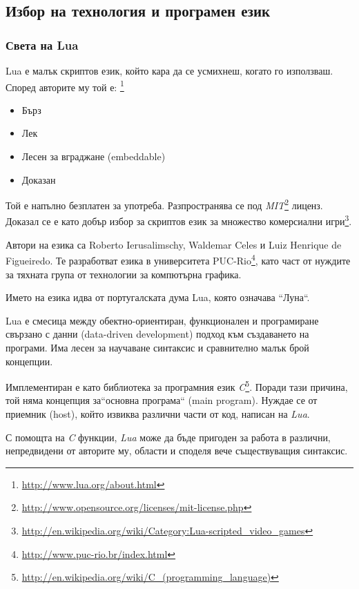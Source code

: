 	\subsection{Избор на технология и програмен език}
		\subsubsection{Света на Lua}
		
			Lua е малък скриптов език, който кара да се усмихнеш, когато го използваш. 
			Според авторите му той е: \footnote{\url{http://www.lua.org/about.html}} 
			
			\begin{itemize}
				\item Бърз
				\item Лек
				\item Лесен за вграджане (embeddable)
				\item Доказан
			\end{itemize}
			
			Той е напълно безплатен за употреба. Разпространява се под 
			\emph{MIT}\footnote{\url{http://www.opensource.org/licenses/mit-license.php}} лиценз. 
			Доказал се е като добър избор за скриптов език за множество комерсиални 
			игри\footnote{\url{http://en.wikipedia.org/wiki/Category:Lua-scripted_video_games}}.
			
			Автори на езика са Roberto Ierusalimschy, Waldemar Celes и Luiz Henrique de Figueiredo. Те разработват езика в
			университета PUC-Rio\footnote{\url{http://www.puc-rio.br/index.html}}, като част от нуждите за тяхната група
			от технологии за компютърна графика. 
			
			Името на езика идва от португалската дума Lua, която означава ``Луна``.
			
			Lua е смесица между обектно-ориентиран, функционален и програмиране свързано с данни (data-driven development)
			подход към създаването на програми. Има лесен за научаване синтаксис и сравнително малък брой концепции. 
			
			Имплементиран е като библиотека за програмния език \emph{C}\footnote{\url{http://en.wikipedia.org/wiki/C_(programming_language)}}. 
			Поради тази причина, той няма концепция за``основна програма`` (main program). Нуждае се от приемник (host), който извиква различни
			части от код, написан на \emph{Lua}.
			
			С помощта на \emph{C} функции, \emph{Lua} може да бъде пригоден за работа в различни, непредвидени от авторите му,
			области и споделя вече съществуващия синтаксис.
			
